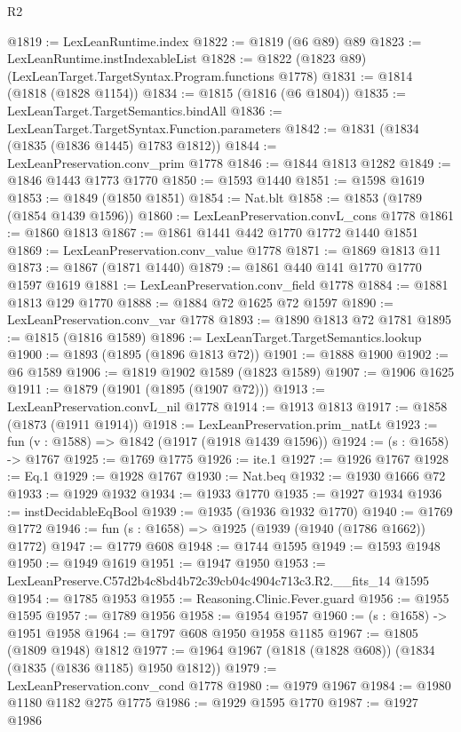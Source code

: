 \begin{lexlean}{R2}
\begin{coremodule}
@1819 := LexLeanRuntime.index
@1822 := @1819 (@6 @89) @89
@1823 := LexLeanRuntime.instIndexableList
@1828 := @1822 (@1823 @89) (LexLeanTarget.TargetSyntax.Program.functions @1778)
@1831 := @1814 (@1818 (@1828 @1154))
@1834 := @1815 (@1816 (@6 @1804))
@1835 := LexLeanTarget.TargetSemantics.bindAll
@1836 := LexLeanTarget.TargetSyntax.Function.parameters
@1842 := @1831 (@1834 (@1835 (@1836 @1445) @1783 @1812))
@1844 := LexLeanPreservation.conv_prim @1778
@1846 := @1844 @1813 @1282
@1849 := @1846 @1443 @1773 @1770
@1850 := @1593 @1440
@1851 := @1598 @1619
@1853 := @1849 (@1850 @1851)
@1854 := Nat.blt
@1858 := @1853 (@1789 (@1854 @1439 @1596))
@1860 := LexLeanPreservation.convL_cons @1778
@1861 := @1860 @1813
@1867 := @1861 @1441 @442 @1770 @1772 @1440 @1851
@1869 := LexLeanPreservation.conv_value @1778
@1871 := @1869 @1813 @11
@1873 := @1867 (@1871 @1440)
@1879 := @1861 @440 @141 @1770 @1770 @1597 @1619
@1881 := LexLeanPreservation.conv_field @1778
@1884 := @1881 @1813 @129 @1770
@1888 := @1884 @72 @1625 @72 @1597
@1890 := LexLeanPreservation.conv_var @1778
@1893 := @1890 @1813 @72 @1781
@1895 := @1815 (@1816 @1589)
@1896 := LexLeanTarget.TargetSemantics.lookup
@1900 := @1893 (@1895 (@1896 @1813 @72))
@1901 := @1888 @1900
@1902 := @6 @1589
@1906 := @1819 @1902 @1589 (@1823 @1589)
@1907 := @1906 @1625
@1911 := @1879 (@1901 (@1895 (@1907 @72)))
@1913 := LexLeanPreservation.convL_nil @1778
@1914 := @1913 @1813
@1917 := @1858 (@1873 (@1911 @1914))
@1918 := LexLeanPreservation.prim_natLt
@1923 := fun (v : @1588) => @1842 (@1917 (@1918 @1439 @1596))
@1924 := (s : @1658) -> @1767
@1925 := @1769 @1775
@1926 := ite.{1}
@1927 := @1926 @1767
@1928 := Eq.{1}
@1929 := @1928 @1767
@1930 := Nat.beq
@1932 := @1930 @1666 @72
@1933 := @1929 @1932
@1934 := @1933 @1770
@1935 := @1927 @1934
@1936 := instDecidableEqBool
@1939 := @1935 (@1936 @1932 @1770)
@1940 := @1769 @1772
@1946 := fun (s : @1658) => @1925 (@1939 (@1940 (@1786 @1662)) @1772)
@1947 := @1779 @608
@1948 := @1744 @1595
@1949 := @1593 @1948
@1950 := @1949 @1619
@1951 := @1947 @1950
@1953 := LexLeanPreserve.C57d2b4c8bd4b72c39cb04c4904c713c3.R2.__fits_14 @1595
@1954 := @1785 @1953
@1955 := Reasoning.Clinic.Fever.guard
@1956 := @1955 @1595
@1957 := @1789 @1956
@1958 := @1954 @1957
@1960 := (s : @1658) -> @1951 @1958
@1964 := @1797 @608 @1950 @1958 @1185
@1967 := @1805 (@1809 @1948) @1812
@1977 := @1964 @1967 (@1818 (@1828 @608)) (@1834 (@1835 (@1836 @1185) @1950 @1812))
@1979 := LexLeanPreservation.conv_cond @1778
@1980 := @1979 @1967
@1984 := @1980 @1180 @1182 @275 @1775
@1986 := @1929 @1595 @1770
@1987 := @1927 @1986

\end{coremodule}
\end{lexlean}
